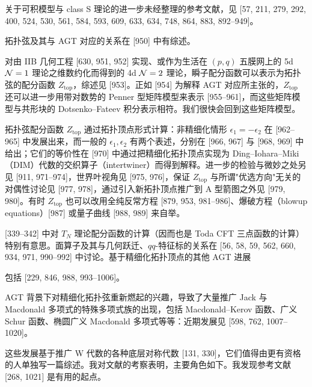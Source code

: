 关于可积模型与 class S 理论的进一步未经整理的参考文献，见 [57, 211, 279, 292, 400, 524, 530, 561, 584, 593, 609, 633, 634, 748, 864, 883, 892--949]。

拓扑弦及其与 AGT 对应的关系在 [950] 中有综述。

对由 IIB 几何工程 [630, 951, 952] 实现、或作为生活在 $(p,q)$ 五膜网上的 5d $\mathcal{N}=1$ 理论之维数约化而得到的 4d $\mathcal{N}=2$ 理论，瞬子配分函数可以表示为拓扑弦的配分函数 $Z_{\text{top}}$，综述见 [953]。正如 [954] 为解释 AGT 对应所主张的，$Z_{\text{top}}$ 还可以进一步用带对数势的 Penner 型矩阵模型来表示 [955--961]，而这些矩阵模型与共形块的 Dotsenko--Fateev 积分表示相符。我们很快会回到这些矩阵模型。

拓扑弦配分函数 $Z_{\text{top}}$ 通过拓扑顶点形式计算：非精细化情形 $\epsilon_1=-\epsilon_2$ 在 [962--965] 中发展出来，而一般的 $\epsilon_1,\epsilon_2$ 有两个表述，分别在 [966, 967] 与 [968, 969] 中给出；它们的等价性在 [970] 中通过把精细化拓扑顶点实现为 Ding--Iohara--Miki（DIM）代数的交织算子（intertwiner）而得到解释。进一步的检验与微妙之处另见 [911, 971--974]，世界叶视角见 [975, 976]，保证 $Z_{\text{top}}$ 与所谓"优选方向"无关的对偶性讨论见 [977, 978]，通过引入新拓扑顶点推广到 A 型箭图之外见 [979, 980]。有时 $Z_{\text{top}}$ 也可以改用全纯反常方程 [879, 953, 981--986]、爆破方程（blowup equations）[987] 或量子曲线 [988, 989] 来自举。

[339--342] 中对 $T_N$ 理论配分函数的计算（因而也是 Toda CFT 三点函数的计算）特别有意思。面算子及其与几何跃迁、$qq$-特征标的关系在 [56, 58, 59, 562, 660, 934, 971, 990--992] 中讨论。基于精细化拓扑顶点的其他 AGT 进展

包括 [229, 846, 988, 993--1006]。

AGT 背景下对精细化拓扑弦重新燃起的兴趣，导致了大量推广 Jack 与 Macdonald 多项式的特殊多项式族的出现，包括 Macdonald--Kerov 函数、广义 Schur 函数、椭圆广义 Macdonald 多项式等等：近期发展见 [598, 762, 1007--1020]。

这些发展基于推广 W 代数的各种底层对称代数 [131, 330]，它们值得由更有资格的人单独写一篇综述。我对文献的考察表明，主要角色如下。我发现参考文献 [268, 1021] 是有用的起点。

